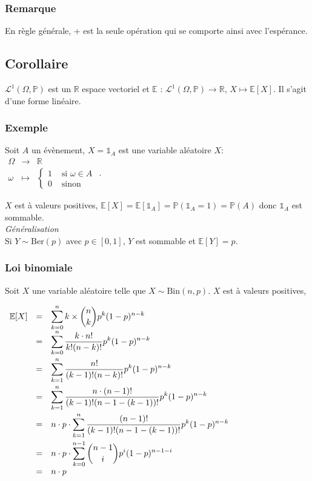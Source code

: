 \documentclass[a4paper,10pt]{book} %
\newcommand{\R}{\mathbb{R}}
\newcommand{\E}{\mathbb{E}} %
\renewcommand{\P}{\mathbb{P}} %
\newcommand{\Ber}{\mathrm{Ber}} %
\newcommand{\Bin}{\mathrm{Bin}} %
\newcommand{\indi}{\mathds{1}} %
\begin{document}
\subsubsection{Remarque}
En règle générale, + est la seule opération qui se comporte ainsi avec l'espérance.

\subsection{Corollaire}
$\mathcal{L}^1(\Omega,\P)$ est un $\R$ espace vectoriel et $\E$ : $\mathcal{L}^1(\Omega,\P)\rightarrow \R$, $X\mapsto \E[X]$.
Il s'agit d'une forme linéaire.

\subsubsection{Exemple}
Soit $A$ un évènement, $X = \indi_A$ est une variable aléatoire $X :$
$\begin{array}{rcl}
    \Omega &\rightarrow& \R \\
    \omega &\mapsto& 
        \left\{\begin{array}{rl} 
            1&\text{ si }\omega\in A \\ 
            0 &\text{ sinon}
        \end{array}\right.
\end{array}$.

$X$ est à valeurs positives, $\E[X] =\E[\indi_A]=\P(\indi_A=1)=\P(A)$ donc $\indi_A$ est sommable.\\

\textit{Généralisation}\\
Si $Y\sim \Ber(p)$ avec $p\in[0,1]$, $Y$ est sommable et $\E[Y] =p$.

\subsubsection{Loi binomiale}
Soit $X$ une variable aléatoire telle que $X\sim \Bin(n,p)$. $X$ est à valeurs positives, 

$\begin{array}{rcl}\E[X] &=& \displaystyle \sum_{k=0}^n k\times \binom{n}{k}p^k(1-p)^{n-k} \\\smallskip
&=& \displaystyle \sum_{k=0}^n \frac{k \cdot n!}{k!(n-k)!}p^k(1-p)^{n-k} \\\smallskip
&=& \displaystyle \sum_{k=1}^n \frac{n!}{(k-1)!(n-k)!}p^k(1-p)^{n-k} \\\smallskip
&=& \displaystyle \sum_{k=1}^n \frac{n \cdot (n-1)!}{(k-1)!(n-1-(k-1))!}p^k(1-p)^{n-k} \\\smallskip
&=& \displaystyle n\cdot p\cdot \sum_{k=1}^n\frac{(n-1)!}{(k-1)!(n-1-(k-1))!}p^k(1-p)^{n-k} \\
&=& \displaystyle n\cdot p\cdot \sum_{k=0}^{n-1}\binom{n-1}{i}p^i(1-p)^{n-1-i}\\
&=& \displaystyle n\cdot p
\end{array}$
\end{document}
